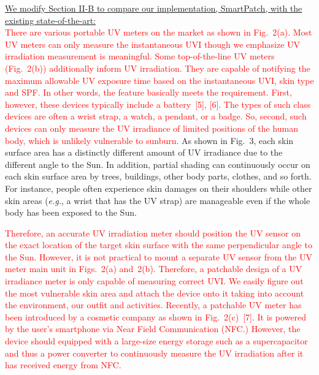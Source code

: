 \documentclass[onecolumn]{IEEEconf}
\begin{document}
\begin{description}
\underline{We modify Section II-B to compare our implementation, SmartPatch, with the existing state-of-the-art:}\\
\textcolor{red}{There are various portable UV meters on the market as shown in Fig.~2(a). Most UV meters can only measure the instantaneous UVI though we emphasize UV irradiation measurement is meaningful. Some top-of-the-line UV meters (Fig.~2(b)) additionally inform UV irradiation. They are capable of notifying the maximum allowable UV exposure time based on the instantaneous UVI, skin type and SPF. In other words, the feature basically meets the requirement.  First, however, these devices typically include a battery~[5], [6]. The types of such class devices are often a wrist strap, a watch, a pendant, or a badge. So, second, such devices can only measure the UV irradiance of limited positions of the human body, which is unlikely vulnerable to sunburn.} 
%
As shown in Fig.~3, each skin surface area has a distinctly different amount of UV irradiance due to the different angle to the Sun. In addition, partial shading can continuously occur on each skin surface area by trees, buildings, other body parts, clothes, and so forth. For instance, people often experience skin damages on their shoulders while other skin areas (\textit{e.g.}, a wrist that has the UV strap) are manageable even if the whole body has been exposed to the Sun.

\textcolor{red}{Therefore, an accurate UV irradiation meter should position the UV sensor on the exact location of the target skin surface with the same perpendicular angle to the Sun. However, it is not practical to mount a separate UV sensor from the \textcolor{red}{UV meter main unit in Figs.~2(a) and~2(b)}. Therefore, a patchable design of a UV irradiance meter is only capable of measuring correct UVI. We easily figure out the most vulnerable skin area and attach the device onto it taking into account the environment, our outfit and activities. Recently, a patchable UV meter has been introduced by a cosmetic company as shown in Fig.~2(c)~[7]. It is powered by the user's smartphone via Near Field Communication (NFC.) However, the device should equipped with a large-size energy storage such as a supercapacitor and thus a power converter to continuously measure the UV irradiation after it has received energy from NFC.}\\
~\\


\end{description}
\end{document}

